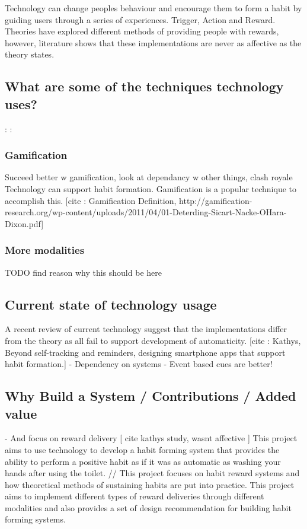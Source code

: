 Technology can change peoples behaviour and encourage them to form a habit by guiding users through a series of experiences. Trigger, Action and Reward. Theories have explored different methods of providing people with rewards, however, literature shows that these implementations are never as affective as the theory states.

\subsection*{What are some of the techniques technology uses?}

:\newline
:

\subsubsection*{Gamification}
Succeed better w gamification, look at dependancy w other things, clash royale
Technology can support habit formation. Gamification is a popular technique to accomplish this. [cite : Gamification Definition, http://gamification-research.org/wp-content/uploads/2011/04/01-Deterding-Sicart-Nacke-OHara-Dixon.pdf]

\subsubsection*{More modalities}
TODO find reason why this should be here


\subsection*{Current state of technology usage}

A recent review of current technology suggest that the implementations differ from the theory as all fail to support development of automaticity. [cite : Kathys, Beyond self-tracking and reminders, designing smartphone apps that support habit formation.]
- Dependency on systems
- Event based cues are better!

\subsection*{Why Build a System / Contributions / Added value}

- And focus on reward delivery [ cite kathys study, wasnt affective ]
This project aims to use technology to develop a habit forming system that provides the ability to perform a positive habit as if it was as automatic as washing your hands after using the toilet. // This project focuses on habit reward systems and how theoretical methods of sustaining habits are put into practice. This project aims to implement different types of reward deliveries through different modalities and also provides a set of design recommendation for building habit forming systems.

